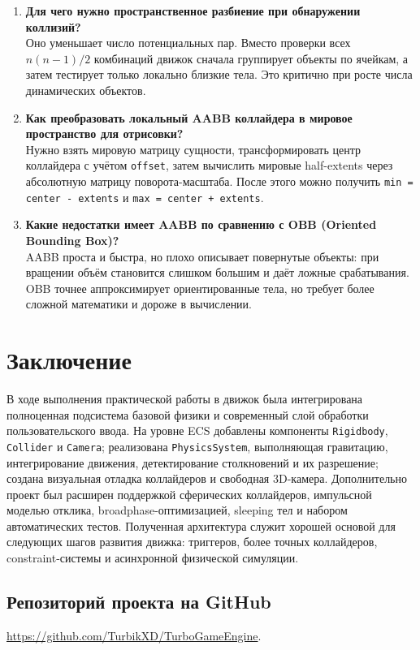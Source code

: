 \documentclass[a4paper,14pt]{extarticle}
\begin{document}
\begin{enumerate}
  \item \textbf{Для чего нужно пространственное разбиение при обнаружении коллизий?}\\
  Оно уменьшает число потенциальных пар. Вместо проверки всех \(n(n-1)/2\) комбинаций движок сначала группирует объекты по ячейкам, а затем тестирует только локально близкие тела. Это критично при росте числа динамических объектов.

  \item \textbf{Как преобразовать локальный AABB коллайдера в мировое пространство для отрисовки?}\\
  Нужно взять мировую матрицу сущности, трансформировать центр коллайдера с учётом \texttt{offset}, затем вычислить мировые half-extents через абсолютную матрицу поворота-масштаба. После этого можно получить \texttt{min = center - extents} и \texttt{max = center + extents}.

  \item \textbf{Какие недостатки имеет AABB по сравнению с OBB (Oriented Bounding Box)?}\\
  AABB проста и быстра, но плохо описывает повернутые объекты: при вращении объём становится слишком большим и даёт ложные срабатывания. OBB точнее аппроксимирует ориентированные тела, но требует более сложной математики и дороже в вычислении.
\end{enumerate}

\section{Заключение}
В ходе выполнения практической работы в движок была интегрирована полноценная подсистема базовой физики и современный слой обработки пользовательского ввода. На уровне ECS добавлены компоненты \texttt{Rigidbody}, \texttt{Collider} и \texttt{Camera}; реализована \texttt{PhysicsSystem}, выполняющая гравитацию, интегрирование движения, детектирование столкновений и их разрешение; создана визуальная отладка коллайдеров и свободная 3D-камера. Дополнительно проект был расширен поддержкой сферических коллайдеров, импульсной моделью отклика, broadphase-оптимизацией, sleeping тел и набором автоматических тестов. Полученная архитектура служит хорошей основой для следующих шагов развития движка: триггеров, более точных коллайдеров, constraint-системы и асинхронной физической симуляции.

\subsection*{Репозиторий проекта на GitHub}
\href{https://github.com/TurbikXD/TurboGameEngine}{https://github.com/TurbikXD/TurboGameEngine}.
\end{document}
